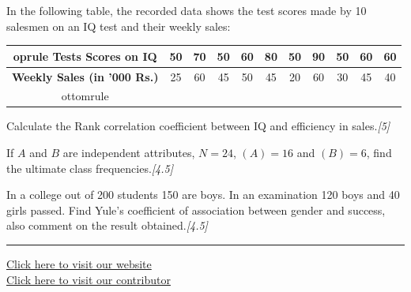 \documentclass[11pt,a4paper]{article}
\newcommand{\pts}[1]{\hfill   \textit{[#1]}}
\begin{document}
\begin{parts}
  \item In the following table, the recorded data shows the test scores made by 10 salesmen on an IQ test and their weekly sales:
  
\begin{center}
  
\begin{tabular}{ccccccccccc}
     oprule
   \textbf{Tests Scores on IQ} & 50 & 70 & 50 & 60 & 80 & 50 & 90 & 50 & 60 & 60 \\
    \midrule
   \textbf{Weekly Sales (in '000 Rs.)} & 25 & 60 & 45 & 50 & 45 & 20 & 60 & 30 & 45 & 40 \\
    ottomrule
  \end{tabular}
  \end{center}
  Calculate the Rank correlation coefficient between IQ and efficiency in sales.\pts{5}
  \item If $A$ and $B$ are independent attributes, $N = 24$, $(A) = 16$ and $(B) = 6$, find the ultimate class frequencies.\pts{4.5}
  \item In a college out of 200 students 150 are boys. In an examination 120 boys and 40 girls passed. Find Yule's coefficient of association between gender and success, also comment on the result obtained.\pts{4.5}
\end{parts}

\vfill
\rule{\linewidth}{0.4pt}

\begin{center}\small
\href{https://bhu-exam.vercel.app/}{Click here to visit our website}\\[4pt]
\href{https://me-aryan.vercel.app/}{Click here to visit our contributor}
\end{center}
\end{document}
